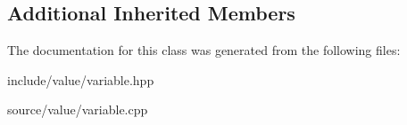 \subsection*{Additional Inherited Members}


The documentation for this class was generated from the following files\+:\begin{DoxyCompactItemize}
\item 
include/value/variable.\+hpp\item 
source/value/variable.\+cpp\end{DoxyCompactItemize}
